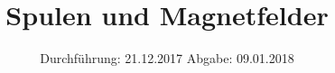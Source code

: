 
\usepackage{wrapfig}

\subject{VERSUCH 308}
\title{Spulen und Magnetfelder}
\date{%
  \hspace{-2.5em}
  Durchführung: 21.12.2017
  \hspace{4em}
  Abgabe: 09.01.2018
}


  \setlength{\parindent}{0em}
  \maketitle
  \thispagestyle{empty}
  \newpage
  \tableofcontents
  \newpage

  
  
  
  

  \printbibliography{}
  
  

